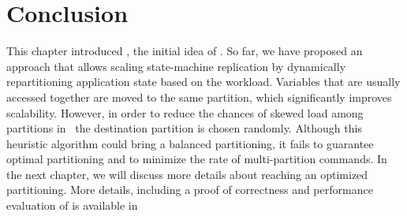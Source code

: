 



\section{Conclusion}
\label{sec:dssmnr-conclusion}
This chapter introduced \dssmr, the initial idea of \dynastar. So far, we have
proposed an approach that allows scaling state-machine replication by
dynamically repartitioning application state based on the workload.  Variables
that are usually accessed together are moved to the same partition, which
significantly improves scalability. However, in order to reduce the chances of
skewed load among partitions in \dssmr\, the destination partition is chosen
randomly. Although this heuristic algorithm could bring a balanced partitioning,
it fails to guarantee optimal partitioning and to minimize the rate of
multi-partition commands. In the next chapter, we will discuss more details
about reaching an optimized partitioning. More details, including a proof of
correctness and performance evaluation of \dssmr{} is available in
\cite{le2016dssmr}

